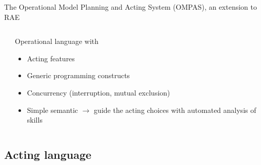 \begin{frame}{The Operational Model Planning and Acting System (OMPAS), an extension to RAE}
\begin{columns}[t]
\begin{column}{0.5\textwidth}
        \end{column}
        \pause
        \begin{column}{0.5\textwidth}
        Operational language with
        \begin{itemize}
            \item Acting features
            \item Generic programming constructs
            \item Concurrency (interruption, mutual exclusion)
            \item Simple semantic $\rightarrow$ guide the acting choices with automated analysis of skills
        \end{itemize}
        \end{column}
    \end{columns}
\end{frame}

\subsection{Acting language}

    

